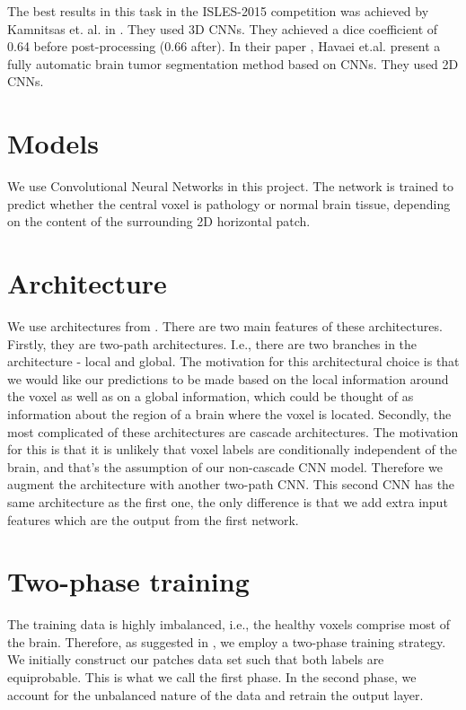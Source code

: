 \documentclass[12pt]{report}
\begin{document}
The best results in this task in the ISLES-2015 competition was achieved by Kamnitsas et. al. in \cite{K}. They used 3D CNNs. They achieved a dice coefficient of 0.64 before post-processing (0.66 after). In their paper \cite{H}, Havaei et.al. present a fully automatic brain tumor segmentation method based on CNNs. They used 2D CNNs.

\section*{Models}

We use Convolutional Neural Networks in this project. The network is trained to predict whether the central voxel is pathology or normal brain tissue, depending on the content of the surrounding 2D horizontal patch.

\section*{Architecture}

We use architectures from \cite{H} . There are two main features of these architectures.
Firstly, they are two-path architectures. I.e., there are two branches in the architecture - local and global. The motivation for this architectural choice is that we would like our predictions to be made based on the local information around the voxel as well as on a global information, which could be thought of as information about the region of a brain where the voxel is located.
Secondly, the most complicated of these architectures are cascade architectures. The motivation for this is that it is unlikely that voxel labels are conditionally independent of the brain, and that's the assumption of our non-cascade CNN model. Therefore we augment the architecture with another two-path CNN. This second CNN has the same architecture as the first one, the only difference is that we add extra input features which are the output from the first network.

\section*{Two-phase training}

The training data is highly imbalanced, i.e., the healthy voxels comprise most of the brain. Therefore, as suggested in \cite{H}, we employ a two-phase training strategy. We initially construct our patches data set such that both labels are equiprobable. This is what we call the first phase. In the second phase, we account for the unbalanced nature of the data and retrain the output layer.
\end{document}
